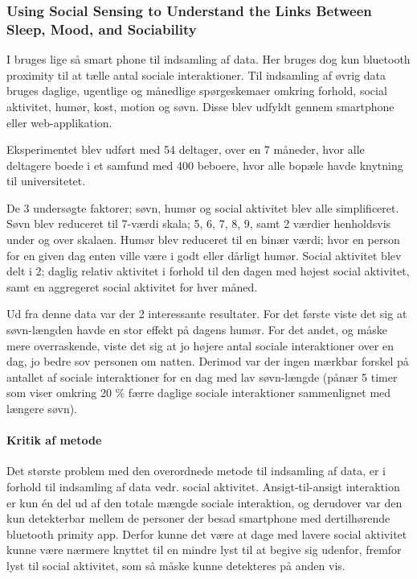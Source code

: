\subsubsection{Using Social Sensing to Understand the Links Between Sleep, Mood, and Sociability}
I \citet{social_sensing_2} bruges lige så smart phone til indsamling af data.
Her bruges dog kun bluetooth proximity til at tælle antal sociale interaktioner.
Til indsamling af øvrig data bruges daglige, ugentlige og månedlige spørgeskemaer omkring forhold, social aktivitet, humør, kost, motion og søvn.
Disse blev udfyldt gennem smartphone eller web-applikation.

Eksperimentet blev udført med 54 deltager, over en 7 måneder, hvor alle deltagere boede i et samfund med 400 beboere, hvor alle bopæle havde knytning til universitetet.

De 3 undersøgte faktorer; søvn, humør og social aktivitet blev alle simplificeret.
Søvn blev reduceret til 7-værdi skala; 5, 6, 7, 8, 9, samt 2 værdier henholdsvis under og over skalaen.
Humør blev reduceret til en binær værdi; hvor en person for en given dag enten ville være i godt eller dårligt humør.
Social aktivitet blev delt i 2; daglig relativ aktivitet i forhold til den dagen med højest social aktivitet, samt en aggregeret social aktivitet for hver måned.

Ud fra denne data var der 2 interessante resultater.
For det første viste det sig at søvn-længden havde en stor effekt på dagens humør.
For det andet, og måske mere overraskende, viste det sig at jo højere antal sociale interaktioner over en dag, jo bedre sov personen om natten.
Derimod var der ingen mærkbar forskel på antallet af sociale interaktioner for en dag med lav søvn-længde (pånær 5 timer som viser omkring 20 \% færre daglige sociale interaktioner sammenlignet med længere søvn).

\paragraph{Kritik af metode}
Det største problem med den overordnede metode til indsamling af data, er i forhold til indsamling af data vedr. social aktivitet.
Ansigt-til-ansigt interaktion er kun én del ud af den totale mængde sociale interaktion, og derudover var den kun detekterbar mellem de personer der besad smartphone med dertilhørende bluetooth primity app.
Derfor kunne det være at dage med lavere social aktivitet kunne være nærmere knyttet til en mindre lyst til at begive sig udenfor, fremfor lyst til social aktivitet, som så måske kunne detekteres på anden vis.

